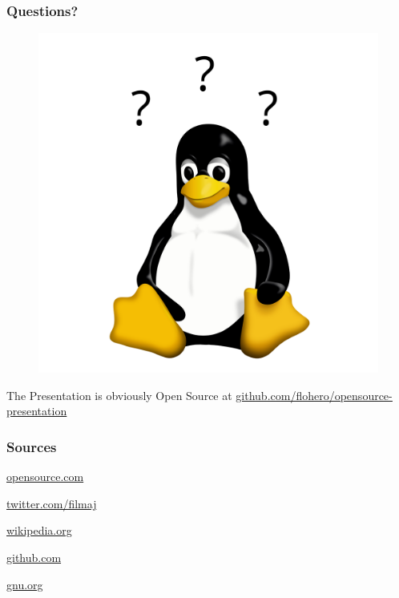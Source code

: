 \documentclass{beamer}
\begin{document}
\begin{frame}
  \frametitle{Questions?}
  \begin{center}
    \begin{figure}
      \includegraphics[scale=0.3]{./img/tux_questions.png}
    \end{figure}
    The Presentation is obviously Open Source at
    \underline{
      \href{https://github.com/flohero/opensource-presentation}
           {github.com/flohero/opensource-presentation}
    }
    \end{center}
\end{frame}

\begin{frame}
  \frametitle{Sources}
  \begin{center}
    \Large
    \href{https://opensource.com/open-source-way}{opensource.com}
    
    \href{https://twitter.com/filmaj}{twitter.com/filmaj}

    \href{https://en.wikipedia.org}{wikipedia.org}

    \href{https://github.com}{github.com}

    \href{https://www.gnu.org/philosophy/open-source-misses-the-point}{gnu.org}
    
  \end{center}
\end{frame}
\end{document}
